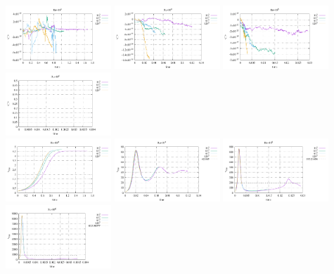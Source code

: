 \begin{center}
\includegraphics[width=3.97cm]{python_codes/fieldstone_155/results/avrg_T_Ra1e3}
\includegraphics[width=3.97cm]{python_codes/fieldstone_155/results/avrg_T_Ra1e4}
\includegraphics[width=3.97cm]{python_codes/fieldstone_155/results/avrg_T_Ra1e5}
\includegraphics[width=3.97cm]{python_codes/fieldstone_155/results/avrg_T_Ra1e6}
\\
\includegraphics[width=3.97cm]{python_codes/fieldstone_155/results/vrms_Ra1e3}
\includegraphics[width=3.97cm]{python_codes/fieldstone_155/results/vrms_Ra1e4}
\includegraphics[width=3.97cm]{python_codes/fieldstone_155/results/vrms_Ra1e5}
\includegraphics[width=3.97cm]{python_codes/fieldstone_155/results/vrms_Ra1e6}\\

\end{center}
